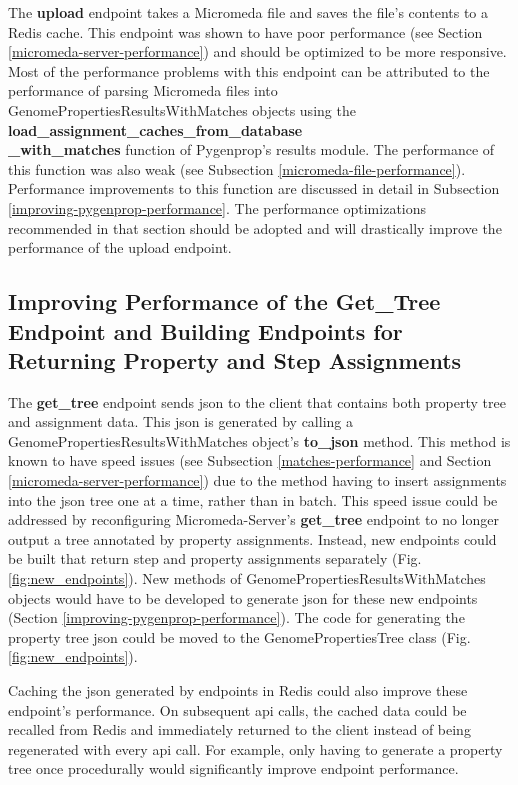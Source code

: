 The \textbf{upload} endpoint takes a Micromeda file and saves the file's 
contents to a Redis cache. This endpoint was shown to have poor performance (see 
Section \ref{micromeda-server-performance}) and should be optimized to be more 
responsive. Most of the performance problems with this endpoint can be 
attributed to the performance of parsing Micromeda files into 
GenomePropertiesResultsWithMatches objects using the 
\textbf{load\_assignment\_caches\_from\_database \\ \_with\_matches} function of 
Pygenprop's results module. The performance of this function was also weak (see 
Subsection \ref{micromeda-file-performance}). Performance improvements to this 
function are discussed in detail in Subsection 
\ref{improving-pygenprop-performance}. The performance optimizations recommended 
in that section should be adopted and will drastically improve the performance 
of the upload endpoint.

\subsection{Improving Performance of the Get\_Tree Endpoint and Building 
Endpoints for Returning Property and Step Assignments} 
\label{assignment-endpoints}

The \textbf{get\_tree} endpoint sends \gls{json} to the client that contains 
both property tree and assignment data. This \gls{json} is generated by calling 
a GenomePropertiesResultsWithMatches object's \textbf{to\_json} method. This 
method is known to have speed issues (see Subsection \ref{matches-performance} 
and Section \ref{micromeda-server-performance}) due to the method having to 
insert assignments into the \gls{json} tree one at a time, rather than in batch. 
This speed issue could be addressed by reconfiguring Micromeda-Server's 
\textbf{get\_tree} endpoint to no longer output a tree annotated by property 
assignments. Instead, new endpoints could be built that return step and property 
assignments separately (Fig. \ref{fig:new_endpoints}). New methods of 
GenomePropertiesResultsWithMatches objects would have to be developed to 
generate \gls{json} for these new endpoints (Section 
\ref{improving-pygenprop-performance}). The code for generating the property 
tree \gls{json} could be moved to the GenomePropertiesTree class (Fig. 
\ref{fig:new_endpoints}).

Caching the \gls{json} generated by endpoints in Redis could also improve these 
endpoint's performance. On subsequent \gls{api} calls, the cached data could be 
recalled from Redis and immediately returned to the client instead of being 
regenerated with every \gls{api} call. For example, only having to generate a 
property tree once procedurally would significantly improve endpoint 
performance.

